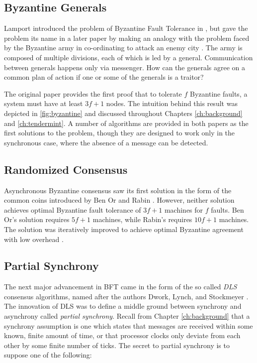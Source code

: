 \subsection{Byzantine Generals}

Lamport introduced the problem of Byzantine Fault Tolerance in \cite{pease1980reaching},
but gave the problem its name in a later paper by making an analogy with the problem faced
by the Byzantine army in co-ordinating to attack an enemy city \cite{lamport1982byzantine}.
The army is composed of multiple divisions, each of which is led by a general.
Communication between generals happens only via messenger.
How can the generals agree on a common plan of action if one or some of the generals is a traitor?

The original paper provides the first proof that to tolerate $f$ Byzantine faults,
a system must have at least $3f+1$ nodes. 
The intuition behind this result was depicted in \ref{fig:byzantine} and discussed 
throughout Chapters \ref{ch:background} and \ref{ch:tendermint}.
A number of algorithms are provided in both papers as the first solutions to the problem,
though they are designed to work only in the synchronous case, where the absence of a message can be detected.

\subsection{Randomized Consensus}

Asynchronous Byzantine consensus saw its first solution in the form of the common coins
introduced by Ben Or \cite{free-choice} and Rabin \cite{rabin1983randomized}.
However, neither solution achieves optimal Byzantine fault tolerance of $3f+1$ machines for $f$ faults.
Ben Or's solution requires $5f+1$ machines, while Rabin's requires $10f+1$ machines.
The solution was iteratively improved to achieve optimal Byzantine agreement with low overhead \cite{feldman1988optimal,canetti1993fast,cachin2000random}.

\subsection{Partial Synchrony}

The next major advancement in BFT came in the form of the so called \emph{DLS} consensus algorithms,
named after the authors Dwork, Lynch, and Stockmeyer \cite{dls}.
The innovation of DLS was to define a middle ground between synchrony and asynchrony called \emph{partial synchrony}.
Recall from Chapter \ref{ch:background} that a synchrony assumption is one which states that messages 
are received within some known, finite amount of time, 
or that processor clocks only deviate from each other by some finite number of ticks.
The secret to partial synchrony is to suppose one of the following:

